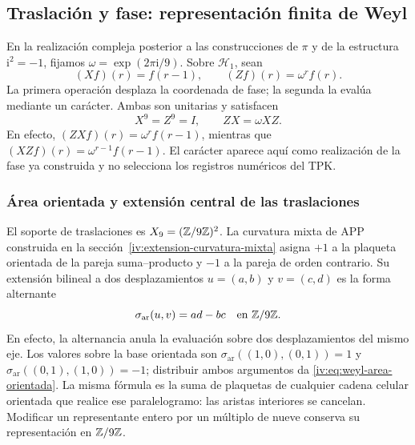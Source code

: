 \subsection{Traslación y fase: representación finita de Weyl}

En la realización compleja posterior a las construcciones de
\(\pi\) y de la estructura \(\mathrm i^2=-1\), fijamos
\(\omega=\exp(2\pi\mathrm i/9)\). Sobre \(\mathcal H_1\), sean
\begin{equation}
 (Xf)(r)=f(r-1),\qquad (Zf)(r)=\omega^r f(r).
 \label{iv:eq:weyl-operadores}
\end{equation}
La primera operación desplaza la coordenada de fase; la segunda la
evalúa mediante un carácter. Ambas son unitarias y satisfacen
\begin{equation}
 X^9=Z^9=I,\qquad ZX=\omega XZ.
 \label{iv:eq:weyl-relacion}
\end{equation}
En efecto, \((ZXf)(r)=\omega^r f(r-1)\), mientras que
\((XZf)(r)=\omega^{r-1}f(r-1)\). El carácter aparece aquí como
realización de la fase ya construida y no selecciona los registros
numéricos del TPK.

\subsubsection{Área orientada y extensión central de las traslaciones}
\label{iv:weyl-area-extension}

El soporte de traslaciones es \(X_9=(\mathbb Z/9\mathbb Z)^2\).
La curvatura mixta de APP construida en la
sección~\ref{iv:extension-curvatura-mixta} asigna \(+1\) a la
plaqueta orientada de la pareja suma--producto y \(-1\) a la
pareja de orden contrario. Su extensión bilineal a dos desplazamientos
\(u=(a,b)\) y \(v=(c,d)\) es la forma alternante
\begin{equation}
 \sigma_{\mathrm{ar}}(u,v)=ad-bc\quad\text{en }\mathbb Z/9\mathbb Z.
 \label{iv:eq:weyl-area-orientada}
\end{equation}
En efecto, la alternancia anula la evaluación sobre dos desplazamientos
del mismo eje. Los valores sobre la base orientada son
\(\sigma_{\mathrm{ar}}((1,0),(0,1))=1\) y
\(\sigma_{\mathrm{ar}}((0,1),(1,0))=-1\); distribuir ambos
argumentos da \eqref{iv:eq:weyl-area-orientada}. La misma fórmula es
la suma de plaquetas de cualquier cadena celular orientada que realice
ese paralelogramo: las aristas interiores se cancelan. Modificar un
representante entero por un múltiplo de nueve conserva su representación
en \(\mathbb Z/9\mathbb Z\).

